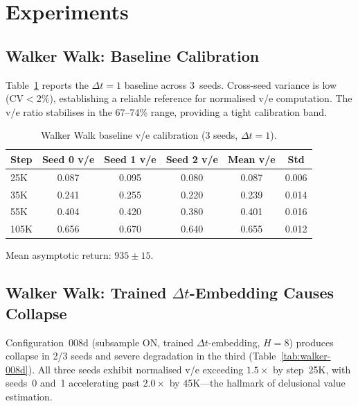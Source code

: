 \documentclass[letterpaper]{article}
\begin{document}
\section{Experiments}

\subsection{Walker Walk: Baseline Calibration}
\label{sec:walker-baseline}

Table~\ref{tab:walker-baseline} reports the $\Delta t{=}1$ baseline across 3~seeds.
Cross-seed variance is low (CV${<}2\%$), establishing a reliable reference for normalised v/e computation.
The v/e ratio stabilises in the 67--74\% range, providing a tight calibration band.

\begin{table}[h]
\centering
\caption{Walker Walk baseline v/e calibration (3 seeds, $\Delta t{=}1$).}
\label{tab:walker-baseline}
\begin{tabular}{lccccc}
\toprule
Step & Seed 0 v/e & Seed 1 v/e & Seed 2 v/e & Mean v/e & Std \\
\midrule
25K  & 0.087 & 0.095 & 0.080 & 0.087 & 0.006 \\
35K  & 0.241 & 0.255 & 0.220 & 0.239 & 0.014 \\
55K  & 0.404 & 0.420 & 0.380 & 0.401 & 0.016 \\
105K & 0.656 & 0.670 & 0.640 & 0.655 & 0.012 \\
\bottomrule
\end{tabular}
\vspace{0.5em}

Mean asymptotic return: $935 \pm 15$.
\end{table}

\subsection{Walker Walk: Trained $\Delta t$-Embedding Causes Collapse}
\label{sec:walker-collapse}

Configuration~008d (subsample ON, trained $\Delta t$-embedding, $H{=}8$) produces collapse in 2/3 seeds and severe degradation in the third (Table~\ref{tab:walker-008d}).
All three seeds exhibit normalised v/e exceeding $1.5\times$ by step~25K, with seeds~0 and~1 accelerating past $2.0\times$ by 45K---the hallmark of delusional value estimation.
\end{document}
